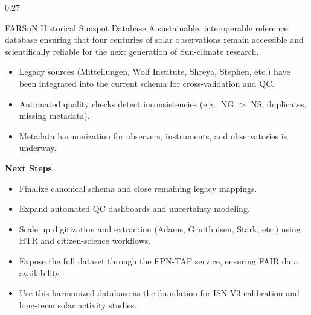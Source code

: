 \documentclass[final]{beamer}
\newenvironment{tightblock}[1]{%
  \begin{block}{#1}\vspace{0.35em}
}{\end{block}}
\begin{document}
\begin{frame}[t]
\begin{columns}[t,totalwidth=0.98\paperwidth]
\begin{column}{0.27\paperwidth}
%
\begin{tightblock}{FARSuN Historical Sunspot Database} %
  A sustainable, interoperable reference database ensuring that four centuries of solar observations remain accessible and scientifically reliable for the next generation of Sun-climate research. \\
  \begin{itemize}
    \item Legacy sources (Mitteilungen, Wolf Institute, Shreya, Stephen, etc.) have been integrated into the current schema for cross-validation and QC.
    \item Automated quality checks detect inconsistencies (e.g., NG $>$ NS, duplicates, missing metadata).
    \item Metadata harmonization for observers, instruments, and observatories is underway.%
  \end{itemize}

  \textbf{Next Steps}
  \begin{itemize}
    \item Finalize canonical schema and close remaining legacy mappings.
    \item Expand automated QC dashboards and uncertainty modeling.
    \item Scale up digitization and extraction (Adams, Gruithuisen, Stark, etc.) using HTR and citizen-science workflows.
    \item Expose the full dataset through the EPN-TAP service, ensuring FAIR data availability.
    \item Use this harmonized database as the foundation for ISN V3 calibration and long-term solar activity studies.
  \end{itemize}


\end{tightblock}
\end{column}
\end{columns}
\end{frame}
\end{document}

